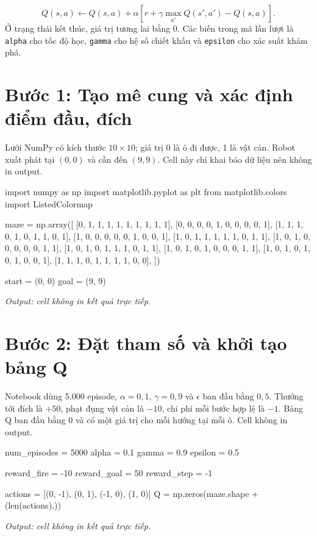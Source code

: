 \documentclass[12pt,a4paper]{report}
\begin{document}
\begin{equation}
Q(s,a)\leftarrow Q(s,a)+\alpha\left[r+\gamma\max_{a'}Q(s',a')-Q(s,a)\right].
\label{eq:qlearning}
\end{equation}
Ở trạng thái kết thúc, giá trị tương lai bằng $0$. Các biến trong mã lần lượt là
\texttt{alpha} cho tốc độ học, \texttt{gamma} cho hệ số chiết khấu và
\texttt{epsilon} cho xác suất khám phá.

\section{Bước 1: Tạo mê cung và xác định điểm đầu, đích}
Lưới NumPy có kích thước $10\times10$; giá trị 0 là ô đi được, 1 là vật cản. Robot xuất phát tại $(0,0)$ và cần đến $(9,9)$. Cell này chỉ khai báo dữ liệu nên không in output.

\begin{Code}
import numpy as np
import matplotlib.pyplot as plt
from matplotlib.colors import ListedColormap

maze = np.array([
    [0, 1, 1, 1, 1, 1, 1, 1, 1, 1],
    [0, 0, 0, 0, 1, 0, 0, 0, 0, 1],
    [1, 1, 1, 0, 1, 0, 1, 1, 0, 1],
    [1, 0, 0, 0, 0, 0, 1, 0, 0, 1],
    [1, 0, 1, 1, 1, 1, 1, 0, 1, 1],
    [1, 0, 1, 0, 0, 0, 0, 0, 1, 1],
    [1, 0, 1, 0, 1, 1, 1, 0, 1, 1],
    [1, 0, 1, 0, 1, 0, 0, 0, 1, 1],
    [1, 0, 1, 0, 1, 0, 1, 0, 0, 1],
    [1, 1, 1, 0, 1, 1, 1, 1, 0, 0],
])

start = (0, 0)
goal = (9, 9)
\end{Code}
\noindent\textit{Output: cell không in kết quả trực tiếp.}

\section{Bước 2: Đặt tham số và khởi tạo bảng Q}
Notebook dùng 5.000 episode, $\alpha=0{,}1$, $\gamma=0{,}9$ và $\epsilon$ ban đầu bằng $0{,}5$. Thưởng tới đích là $+50$, phạt đụng vật cản là $-10$, chi phí mỗi bước hợp lệ là $-1$. Bảng Q ban đầu bằng 0 và có một giá trị cho mỗi hướng tại mỗi ô. Cell không in output.

\begin{Code}
num_episodes = 5000
alpha = 0.1
gamma = 0.9
epsilon = 0.5

reward_fire = -10
reward_goal = 50
reward_step = -1

actions = [(0, -1), (0, 1), (-1, 0), (1, 0)]
Q = np.zeros(maze.shape + (len(actions),))
\end{Code}
\noindent\textit{Output: cell không in kết quả trực tiếp.}
\end{document}

